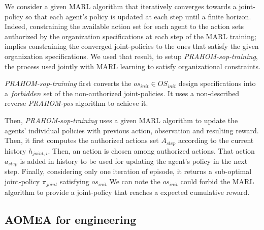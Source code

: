 \documentclass[runningheads]{llncs}
\begin{document}
We consider a given MARL algorithm that iteratively converges towards a joint-policy so that each agent's policy is updated at each step until a finite horizon. Indeed, constraining the available action set for each agent to the action sets authorized by the organization specifications at each step of the MARL training; implies constraining the converged joint-policies to the ones that satisfy the given organization specifications. We used that result, to setup \emph{PRAHOM-sop-training}, the process used jointly with MARL learning to satisfy organizational constraints.

\emph{PRAHOM-sop-training} first converts the $os_{init} \in OS_{init}$ design specifications into a $forbidden$ set of the non-authorized joint-policies. It uses a non-described reverse \emph{PRAHOM-pos} algorithm to achieve it.

Then, \emph{PRAHOM-sop-training} uses a given MARL algorithm to update the agents' individual policies with previous action, observation and resulting reward. Then, it first computes the authorized actions set $A_{step}$ according to the current history $h_{joint,i}$. Then, an action is chosen among authorized actions. That action $a_{step}$ is added in history to be used for updating the agent's policy in the next step.
Finally, considering only one iteration of episode, it returns a sub-optimal joint-policy $\pi_{joint}$ satisfying $os_{init}$
We can note the $os_{init}$ could forbid the MARL algorithm to provide a joint-policy that reaches a expected cumulative reward.

\subsection{AOMEA for engineering}



\end{document}
